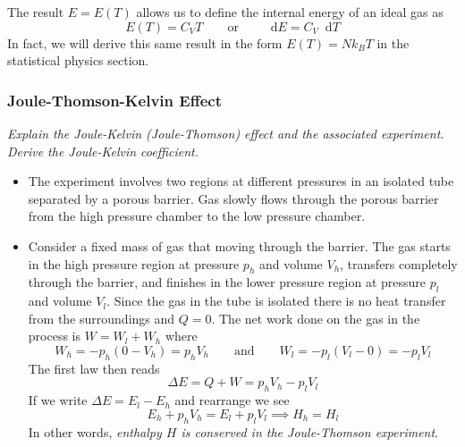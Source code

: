 \documentclass[11pt, a4paper]{article}
\newcommand{\eqtext}[1]{\qquad \text{#1} \qquad}
\newcommand{\diff}{\mathop{}\!\mathrm{d}} %
\begin{document}
\begin{itemize}
	The result $ E = E(T) $ allows us to define the internal energy of an ideal gas as
	\begin{equation*}
		E(T) = C_{V} T \eqtext{or} \diff E = C_{V} \diff T
	\end{equation*}
	In fact, we will derive this same result in the form $ E(T) = Nk_{B}T $ in the statistical physics section.

\end{itemize}


\subsubsection{Joule-Thomson-Kelvin Effect} \label{sss:jtk_experiment}
\textit{Explain the Joule-Kelvin (Joule-Thomson) effect and the associated experiment. Derive the Joule-Kelvin coefficient.}
\begin{itemize}
	\item The experiment involves two regions at different pressures in an isolated tube separated by a porous barrier. Gas slowly flows through the porous barrier from the high pressure chamber to the low pressure chamber. 
	
	\item Consider a fixed mass of gas that moving through the barrier. The gas starts in the high pressure region at pressure $ p_{h} $ and volume $ V_{h} $, transfers completely through the barrier, and finishes in the lower pressure region at pressure $ p_{l} $ and volume $ V_{l} $. Since the gas in the tube is isolated there is no heat transfer from the surroundings and $ Q = 0 $. The net work done on the gas in the process is $ W = W_{l} + W_{h} $ where 
	\begin{equation*}
		W_{h} = - p_{h}(0 - V_{h}) = p_{h}V_{h} \eqtext{and} W_{l} = - p_{l}(V_{l} - 0) = -p_{l}V_{l}
	\end{equation*}
	The first law then reads
	\begin{equation*}
		\Delta E = Q + W = p_{h}V_{h} - p_{l}V_{l}
	\end{equation*}
	If we write $ \Delta E = E_{l} - E_{h}  $ and rearrange we see
	\begin{equation*}
		E_{h} + p_{h}V_{h} =  E_{l} + p_{l}V_{l} \implies H_{h} = H_{l}
	\end{equation*}
	In other words, \textit{enthalpy $ H $ is conserved in the Joule-Thomson experiment}.
	

\end{itemize}
\end{document}
